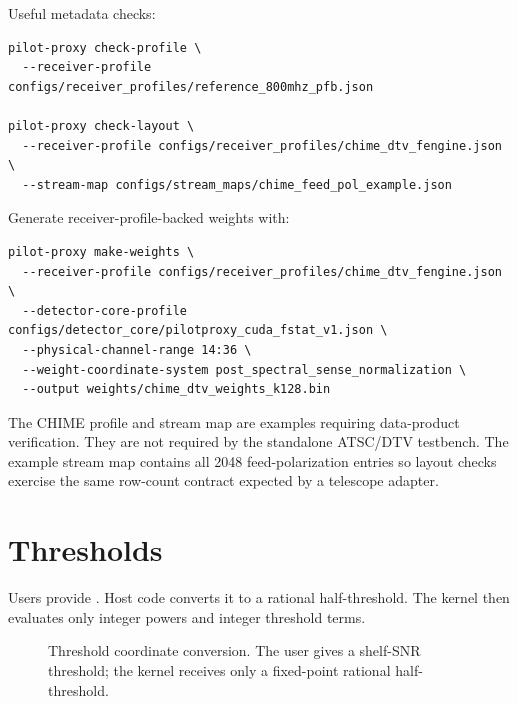 \documentclass[10pt,letterpaper]{article}
\newcommand{\code}[1]{\texttt{\detokenize{#1}}}
\begin{document}
Useful metadata checks:
\begin{lstlisting}[style=shell]
pilot-proxy check-profile \
  --receiver-profile configs/receiver_profiles/reference_800mhz_pfb.json

pilot-proxy check-layout \
  --receiver-profile configs/receiver_profiles/chime_dtv_fengine.json \
  --stream-map configs/stream_maps/chime_feed_pol_example.json
\end{lstlisting}

Generate receiver-profile-backed weights with:
\begin{lstlisting}[style=shell]
pilot-proxy make-weights \
  --receiver-profile configs/receiver_profiles/chime_dtv_fengine.json \
  --detector-core-profile configs/detector_core/pilotproxy_cuda_fstat_v1.json \
  --physical-channel-range 14:36 \
  --weight-coordinate-system post_spectral_sense_normalization \
  --output weights/chime_dtv_weights_k128.bin
\end{lstlisting}

The CHIME profile and stream map are examples requiring data-product
verification.  They are not required by the standalone ATSC/DTV testbench.  The
example stream map contains all 2048 feed-polarization entries so layout checks
exercise the same row-count contract expected by a telescope adapter.

\section{Thresholds}

Users provide \code{threshold_snr_shelf_db}.  Host code converts it to a rational half-threshold.  The kernel then evaluates only integer powers and integer threshold terms.


\begin{figure}[H]
\centering
{}
\caption{Threshold coordinate conversion.  The user gives a shelf-SNR threshold; the kernel receives only a fixed-point rational half-threshold.}
\label{fig:threshold_conversion}
\end{figure}
\end{document}
